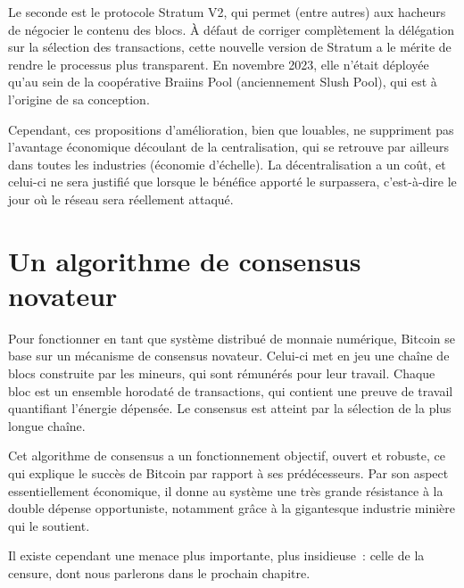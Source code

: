 Le seconde est le protocole Stratum V2, qui permet (entre autres) aux hacheurs de négocier le contenu des blocs. À défaut de corriger complètement la délégation sur la sélection des transactions, cette nouvelle version de Stratum a le mérite de rendre le processus plus transparent. En novembre 2023, elle n'était déployée qu'au sein de la coopérative Braiins Pool (anciennement Slush Pool), qui est à l'origine de sa conception.

Cependant, ces propositions d'amélioration, bien que louables, ne suppriment pas l'avantage économique découlant de la centralisation, qui se retrouve par ailleurs dans toutes les industries (économie d'échelle). La décentralisation a un coût, et celui-ci ne sera justifié que lorsque le bénéfice apporté le surpassera, c'est-à-dire le jour où le réseau sera réellement attaqué.

\section*{Un algorithme de consensus novateur}

Pour fonctionner en tant que système distribué de monnaie numérique, Bitcoin se base sur un mécanisme de consensus novateur. Celui-ci met en jeu une chaîne de blocs construite par les mineurs, qui sont rémunérés pour leur travail. Chaque bloc est un ensemble horodaté de transactions, qui contient une preuve de travail quantifiant l'énergie dépensée. Le consensus est atteint par la sélection de la plus longue chaîne.

Cet algorithme de consensus a un fonctionnement objectif, ouvert et robuste, ce qui explique le succès de Bitcoin par rapport à ses prédécesseurs. Par son aspect essentiellement économique, il donne au système une très grande résistance à la double dépense opportuniste, notamment grâce à la gigantesque industrie minière qui le soutient.

Il existe cependant une menace plus importante, plus insidieuse~: celle de la censure, dont nous parlerons dans le prochain chapitre.